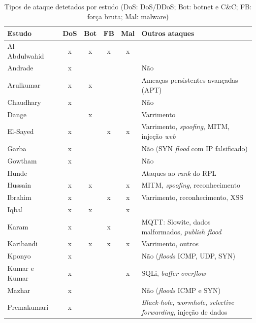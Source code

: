 \documentclass[conference,a4paper]{IEEEtran}
\begin{document}
\begin{table}[p]
\vspace{3mm}
\caption{Tipos de ataque detetados por estudo (DoS: DoS/DDoS; Bot: botnet e C\&C; FB: força bruta; Mal: malware)}\label{tab:ataques}
\centering\scriptsize
\setlength{\tabcolsep}{4pt}\renewcommand{\arraystretch}{0.84}
\begin{tabular}{@{}>{\raggedright\arraybackslash}p{}cccc>{\raggedright\arraybackslash}p{}@{}}
\toprule
Estudo & DoS & Bot & FB & Mal & Outros ataques \\
\midrule
Al Abdulwahid~\cite{Abdulwahid2025} & x & x & x & x & \\
Andrade~\cite{andrade2024ddos} & x & & & & Não \\
Arulkumar~\cite{Arulkumar2026} & x & x & & & Ameaças persistentes avançadas (APT) \\
Chaudhary~\cite{Chaudhary2025} & x & & & & Não \\
Dange~\cite{dange2025dual} & & x & & & Varrimento \\
El-Sayed~\cite{elsayed2024mpguard} & x & & x & x & Varrimento, \textit{spoofing}, MITM, injeção \textit{web} \\
Garba~\cite{garba2024sdn} & x & & & & Não (SYN \textit{flood} com IP falsificado) \\
Gowtham~\cite{gowtham2026fedmp} & x & & & & Não \\
Hunde~\cite{hunde2026rankshield} & & & & & Ataques ao \textit{rank} do RPL \\
Hussain~\cite{hussain2026postquantum} & x & x & & x & MITM, \textit{spoofing}, reconhecimento \\
Ibrahim~\cite{ibrahim2026purechain} & x & & x & x & Varrimento, reconhecimento, XSS \\
Iqbal~\cite{Iqbal2026} & x & x & & x & \\
Karam~\cite{karam2025isaaf} & x & & x & & MQTT: Slowite, dados malformados, \textit{publish flood} \\
Karibandi~\cite{karibandi2025cyberdome} & x & x & x & x & Varrimento, outros \\
Kponyo~\cite{kponyo2020lightweight} & x & & & & Não (\textit{floods} ICMP, UDP, SYN) \\
Kumar e Kumar~\cite{kumar2025advanced} & x & & & x & SQLi, \textit{buffer overflow} \\
Mazhar~\cite{mazhar2022ridps} & x & & & & Não (\textit{floods} ICMP e SYN) \\
Premakumari~\cite{premakumari2025qlearning} & x & & & & \textit{Black-hole}, \textit{wormhole}, \textit{selective forwarding}, injeção de dados \\

\end{tabular}
\end{table}
\end{document}
